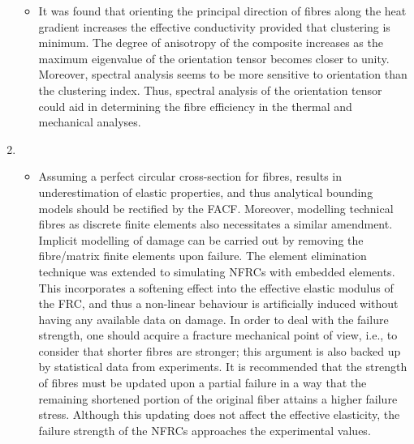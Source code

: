 \begin{enumerate}[label=Stage~\Roman*.]
\begin{itemize}
		\item It was found that orienting the principal direction of fibres along the heat gradient increases the effective conductivity provided that clustering is minimum. The degree of anisotropy of the composite increases as the maximum eigenvalue of the orientation tensor becomes closer to unity. Moreover, spectral analysis seems to be more sensitive to orientation than the clustering index. Thus, spectral analysis of the orientation tensor could aid in determining the fibre efficiency in the thermal and mechanical analyses.
	\end{itemize}
	\item 
	\begin{itemize}
		\item Assuming a perfect circular cross-section for fibres, results in underestimation of elastic properties, and thus analytical bounding models should be rectified by the FACF. Moreover, modelling technical fibres as discrete finite elements also necessitates a similar amendment. Implicit modelling of damage can be carried out by removing the fibre/matrix finite elements upon failure. The element elimination technique was extended to simulating NFRCs with embedded elements. This incorporates a softening effect into the effective elastic modulus of the FRC, and thus a non-linear behaviour is artificially induced without having any available data on damage. In order to deal with the failure strength, one should acquire a fracture mechanical point of view, i.e., to consider that shorter fibres are stronger; this argument is also backed up by statistical data from experiments. It is recommended that the strength of fibres must be updated upon a partial failure in a way that the remaining shortened portion of the original fiber attains a higher failure stress. Although this updating does not affect the effective elasticity, the failure strength of the NFRCs approaches the experimental values.

\end{itemize}
\end{enumerate}
